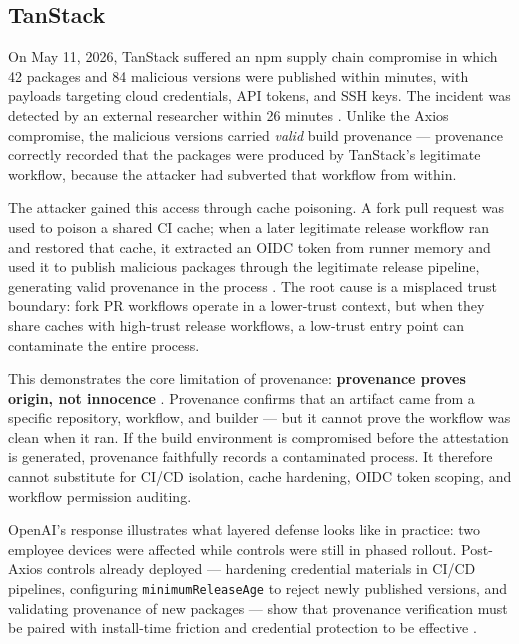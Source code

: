 \documentclass[12pt,a4paper]{article}
\begin{document}
\subsection{TanStack}

On May 11, 2026, TanStack suffered an npm supply chain compromise in which 42 packages and 84 malicious versions were published within minutes, with payloads targeting cloud credentials, API tokens, and SSH keys. The incident was detected by an external researcher within 26 minutes \cite{tanstack-postmortem}. Unlike the Axios compromise, the malicious versions carried \textit{valid} build provenance --- provenance correctly recorded that the packages were produced by TanStack's legitimate workflow, because the attacker had subverted that workflow from within.

The attacker gained this access through cache poisoning. A fork pull request was used to poison a shared CI cache; when a later legitimate release workflow ran and restored that cache, it extracted an OIDC token from runner memory and used it to publish malicious packages through the legitimate release pipeline, generating valid provenance in the process \cite{tanstack-postmortem}. The root cause is a misplaced trust boundary: fork PR workflows operate in a lower-trust context, but when they share caches with high-trust release workflows, a low-trust entry point can contaminate the entire process.

This demonstrates the core limitation of provenance: \textbf{provenance proves origin, not innocence} \cite{tanstack-followup}. Provenance confirms that an artifact came from a specific repository, workflow, and builder --- but it cannot prove the workflow was clean when it ran. If the build environment is compromised before the attestation is generated, provenance faithfully records a contaminated process. It therefore cannot substitute for CI/CD isolation, cache hardening, OIDC token scoping, and workflow permission auditing.

OpenAI's response illustrates what layered defense looks like in practice: two employee devices were affected while controls were still in phased rollout. Post-Axios controls already deployed --- hardening credential materials in CI/CD pipelines, configuring \texttt{minimumReleaseAge} to reject newly published versions, and validating provenance of new packages --- show that provenance verification must be paired with install-time friction and credential protection to be effective \cite{openai-tanstack}.
\end{document}
